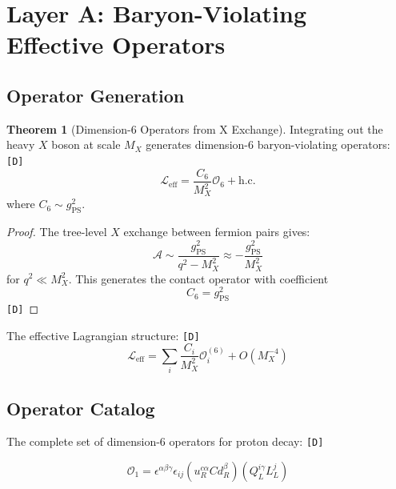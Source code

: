 \documentclass[11pt,a4paper]{article}
\newcommand{\tagD}{\textcolor{green!50!black}{\texttt{[D]}}}
\theoremstyle{definition}
\newtheorem{theorem}{Theorem}[section]
\begin{document}
\section{Layer A: Baryon-Violating Effective Operators}
\label{sec:operators}

\subsection{Operator Generation}
\label{subsec:operator-generation}

\begin{theorem}[Dimension-6 Operators from X Exchange]
\label{thm:dim6-operators}
Integrating out the heavy $X$ boson at scale $M_X$ generates dimension-6
baryon-violating operators: \tagD{}
\begin{equation}
\label{eq:dim6-general}
\boxed{\mathcal{L}_{\text{eff}} = \frac{C_6}{M_X^2} \mathcal{O}_6 + \text{h.c.}}
\end{equation}
where $C_6 \sim g_{\text{PS}}^2$.
\end{theorem}

\begin{proof}
The tree-level $X$ exchange between fermion pairs gives:
\begin{equation}
\label{eq:x-exchange}
\mathcal{A} \sim \frac{g_{\text{PS}}^2}{q^2 - M_X^2} \approx -\frac{g_{\text{PS}}^2}{M_X^2}
\end{equation}
for $q^2 \ll M_X^2$. This generates the contact operator with coefficient
\begin{equation}
\label{eq:c6-coefficient}
C_6 = g_{\text{PS}}^2
\end{equation}
\tagD{}
\end{proof}

The effective Lagrangian structure: \tagD{}
\begin{equation}
\label{eq:leff-structure}
\mathcal{L}_{\text{eff}} = \sum_i \frac{C_i}{M_X^2} \mathcal{O}_i^{(6)} + O(M_X^{-4})
\end{equation}

\subsection{Operator Catalog}
\label{subsec:operator-catalog}

The complete set of dimension-6 operators for proton decay: \tagD{}

\begin{equation}
\label{eq:operator-qqql}
\mathcal{O}_1 = \epsilon^{\alpha\beta\gamma} \epsilon_{ij}
(u^{c\alpha}_R C d^{\beta}_R)(Q^{i\gamma}_L L^j_L)
\end{equation}
\end{document}
